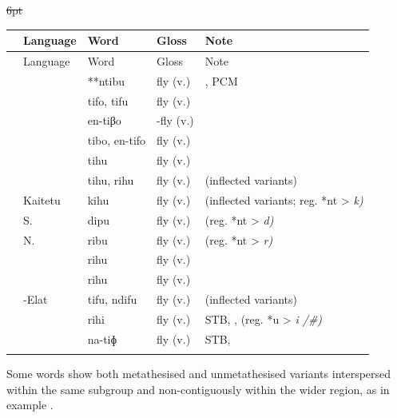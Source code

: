 {\wg\st{6pt}\begin{xltabular}[l]{\linewidth}{>{\hspace{-\tabcolsep}}l<{\hspace{-\tabcolsep}}>{\hspace{-\tabcolsep}\enspace}lll>{\raggedright\arraybackslash}X}
\lsptoprule
{}	&	Language					&	{\hr\hr}Word	&	Gloss	&	Note		\\	\midrule
\endfirsthead
\lsptoprule
{}	&	Language					&	{\hr\hr}Word	&	Gloss	&	Note		\\	\midrule
\endhead
	&					&	**ntibu	&	fly (v.) & \citet[55]{Collins1983}, PCM\\
	&		&	{\hr\hr}tifo, tifu	&	fly (v.)	&		\\
	&		&	{\hr\hr}en-tiβo	&	-fly (v.)	&		\\
	&		&	{\hr\hr}tibo, en-tifo	&	fly (v.)	&		\\
	&		&	{\hr\hr}tihu	&	fly (v.)	&		\\
	&		&	{\hr\hr}tihu, rihu	&	fly (v.)	&	 (inflected variants)	\\
	&	Kaitetu	&	{\hr\hr}kihu	&	fly (v.)	&	 (inflected variants; reg. *nt > \it{k})	\\
	&	S. 	&	{\hr\hr}dipu	&	fly (v.)	&	 (reg. *nt > \it{d)}	\\
	&	N. 	&	{\hr\hr}ribu	&	fly (v.)	&	 (reg. *nt > \it{r)}	\\
	&		&	{\hr\hr}rihu	&	fly (v.)	&		\\
	&		&	{\hr\hr}rihu	&	fly (v.)	&		\\
	&	-Elat	&	{\hr\hr}tifu, ndifu	&	fly (v.)	&	 (inflected variants)	\\
	&		&	{\hr\hr}rihi	&	fly (v.)	&	STB, , (reg. *u > \it{i} /{\gap}{\#})	\\
	&		&	{\hr\hr}na-tiɸ	&	fly (v.)	&	STB, 	\\
\lspbottomrule
\end{xltabular}\addtocounter{table}{-1}}

Some words show both metathesised
and unmetathesised variants interspersed within the same subgroup
and non-contiguously within the wider region,
as in example .


